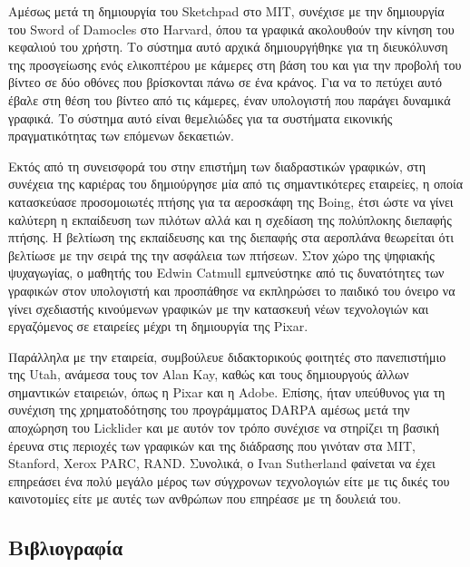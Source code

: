 \documentclass[
]{article}
\newlength{\cslhangindent}
\newlength{\cslentryspacingunit} %
\newenvironment{CSLReferences}[2] %
 {%
  \setlength{\parindent}{0pt}
  \ifodd #1
  \let\oldpar\par
  \def\par{\hangindent=\cslhangindent\oldpar}
  \fi
  \setlength{\parskip}{#2\cslentryspacingunit}
 }%
 {}
\begin{document}
Αμέσως μετά τη δημιουργία του Sketchpad στο MIT, συνέχισε με την
δημιουργία του Sword of Damocles στο Harvard, όπου τα γραφικά ακολουθούν
την κίνηση του κεφαλιού του χρήστη. Το σύστημα αυτό αρχικά δημιουργήθηκε
για τη διευκόλυνση της προσγείωσης ενός ελικοπτέρου με κάμερες στη βάση
του και για την προβολή του βίντεο σε δύο οθόνες που βρίσκονται πάνω σε
ένα κράνος. Για να το πετύχει αυτό έβαλε στη θέση του βίντεο από τις
κάμερες, έναν υπολογιστή που παράγει δυναμικά γραφικά. Το σύστημα αυτό
είναι θεμελιώδες για τα συστήματα εικονικής πραγματικότητας των επόμενων
δεκαετιών.

Εκτός από τη συνεισφορά του στην επιστήμη των διαδραστικών γραφικών, στη
συνέχεια της καριέρας του δημιούργησε μία από τις σημαντικότερες
εταιρείες, η οποία κατασκεύασε προσομοιωτές πτήσης για τα αεροσκάφη της
Boing, έτσι ώστε να γίνει καλύτερη η εκπαίδευση των πιλότων αλλά και η
σχεδίαση της πολύπλοκης διεπαφής πτήσης. Η βελτίωση της εκπαίδευσης και
της διεπαφής στα αεροπλάνα θεωρείται ότι βελτίωσε με την σειρά της την
ασφάλεια των πτήσεων. Στον χώρο της ψηφιακής ψυχαγωγίας, ο μαθητής του
Edwin Catmull εμπνεύστηκε από τις δυνατότητες των γραφικών στον
υπολογιστή και προσπάθησε να εκπληρώσει το παιδικό του όνειρο να γίνει
σχεδιαστής κινούμενων γραφικών με την κατασκευή νέων τεχνολογιών και
εργαζόμενος σε εταιρείες μέχρι τη δημιουργία της Pixar.

Παράλληλα με την εταιρεία, συμβούλευε διδακτορικούς φοιτητές στο
πανεπιστήμιο της Utah, ανάμεσα τους τον Alan Kay, καθώς και τους
δημιουργούς άλλων σημαντικών εταιρειών, όπως η Pixar και η Adobe.
Επίσης, ήταν υπεύθυνος για τη συνέχιση της χρηματοδότησης του
προγράμματος DARPA αμέσως μετά την αποχώρηση του Licklider και με αυτόν
τον τρόπο συνέχισε να στηρίζει τη βασική έρευνα στις περιοχές των
γραφικών και της διάδρασης που γινόταν στα MIT, Stanford, Xerox PARC,
RAND. Συνολικά, ο Ivan Sutherland φαίνεται να έχει επηρεάσει ένα πολύ
μεγάλο μέρος των σύγχρονων τεχνολογιών είτε με τις δικές του καινοτομίες
είτε με αυτές των ανθρώπων που επηρέασε με τη δουλειά του.

\hypertarget{ux3b2ux3b9ux3b2ux3bbux3b9ux3bfux3b3ux3c1ux3b1ux3c6ux3afux3b1}{%
\subsection*{Βιβλιογραφία}\label{ux3b2ux3b9ux3b2ux3bbux3b9ux3bfux3b3ux3c1ux3b1ux3c6ux3afux3b1}}

\hypertarget{refs}{}
\begin{CSLReferences}{0}{0}
\end{CSLReferences}
\end{document}
